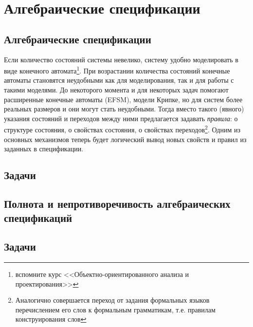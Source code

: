 \documentclass[14pt, twoside]{extreport}
\newcounter{problem_type}[chapter]
\begin{document}
\chapter{Алгебраические спецификации}

\section{Алгебраические спецификации}

Если количество состояний системы невелико, систему удобно моделировать в виде конечного автомата\footnote{вспомните курс <<Объектно-ориентированного анализа и проектирования>>}. При возрастании количества состояний конечные автоматы становятся неудобными как для моделирования, так и для работы с такими моделями. До некоторого момента и для некоторых задач помогают расширенные конечные автоматы (EFSM), модели Крипке, но для систем более реальных размеров и они могут стать неудобными. Тогда вместо такого (явного) указания состояний и переходов между ними предлагается задавать \emph{правила}: о структуре состояния, о свойствах состояния, о свойствах переходов\footnote{Аналогично совершается переход от задания формальных языков перечислением его слов к формальным грамматикам, т.е. правилам конструирования слов}. Одним из основных механизмов теперь будет логический вывод новых свойств и правил из заданных в спецификации.



\section*{Задачи}









\section{Полнота и непротиворечивость алгебраических спецификаций}



\section*{Задачи}




\end{document}
